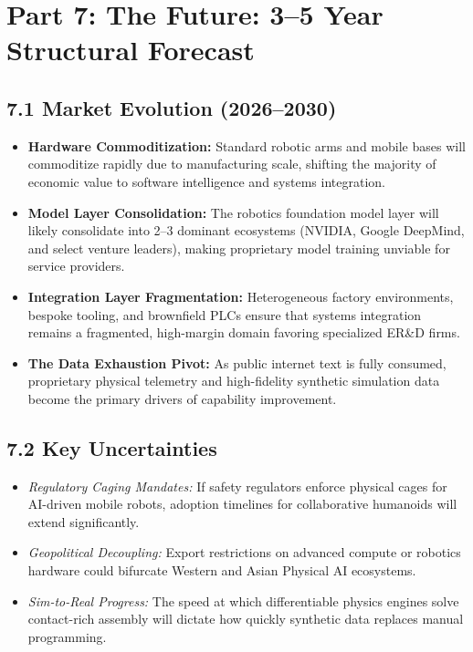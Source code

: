 \documentclass[11pt,a4paper]{article}
\begin{document}
\section{Part 7: The Future: 3--5 Year Structural Forecast}

\subsection{7.1 Market Evolution (2026--2030)}
\begin{itemize}
    \item \textbf{Hardware Commoditization:} Standard robotic arms and mobile bases will commoditize rapidly due to manufacturing scale, shifting the majority of economic value to software intelligence and systems integration.
    \item \textbf{Model Layer Consolidation:} The robotics foundation model layer will likely consolidate into 2--3 dominant ecosystems (NVIDIA, Google DeepMind, and select venture leaders), making proprietary model training unviable for service providers.
    \item \textbf{Integration Layer Fragmentation:} Heterogeneous factory environments, bespoke tooling, and brownfield PLCs ensure that systems integration remains a fragmented, high-margin domain favoring specialized ER\&D firms.
    \item \textbf{The Data Exhaustion Pivot:} As public internet text is fully consumed, proprietary physical telemetry and high-fidelity synthetic simulation data become the primary drivers of capability improvement.
\end{itemize}

\subsection{7.2 Key Uncertainties}
\begin{itemize}
    \item \textit{Regulatory Caging Mandates:} If safety regulators enforce physical cages for AI-driven mobile robots, adoption timelines for collaborative humanoids will extend significantly.
    \item \textit{Geopolitical Decoupling:} Export restrictions on advanced compute or robotics hardware could bifurcate Western and Asian Physical AI ecosystems.
    \item \textit{Sim-to-Real Progress:} The speed at which differentiable physics engines solve contact-rich assembly will dictate how quickly synthetic data replaces manual programming.
\end{itemize}
\end{document}
